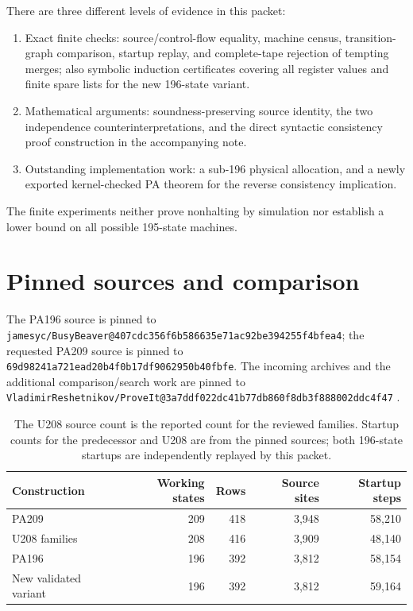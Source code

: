 \documentclass[11pt,letterpaper]{article}
\newcommand{\file}[1]{\texttt{\nolinkurl{#1}}}
\begin{document}
There are three different levels of evidence in this packet:
\begin{enumerate}
\item Exact finite checks: source/control-flow equality, machine census,
transition-graph comparison, startup replay, and complete-tape rejection
of tempting merges; also symbolic induction certificates covering all
register values and finite spare lists for the new 196-state variant.
\item Mathematical arguments: soundness-preserving source identity,
the two independence counterinterpretations, and the direct syntactic
consistency proof construction in the accompanying note.
\item Outstanding implementation work: a sub-196 physical allocation,
and a newly exported
kernel-checked PA theorem for the reverse consistency implication.
\end{enumerate}
The finite experiments neither prove nonhalting by simulation nor establish
a lower bound on all possible 195-state machines.

\section{Pinned sources and comparison}

The PA196 source is pinned to
\file{jamesyc/BusyBeaver@407cdc356f6b586635e71ac92be394255f4bfea4};
the requested PA209 source is pinned to
\file{69d98241a721ead20b4f0b17df9062950b40fbfe}.
The incoming archives and the additional comparison/search work are pinned
to \file{VladimirReshetnikov/ProveIt@3a7ddf022dc41b77db860f8db3f888002ddc4f47}
\cite{pa196,pa209,incoming,comparison}.

\begin{table}[ht]
\centering
\begin{tabular}{@{}lrrrr@{}}
\toprule
Construction & Working states & Rows & Source sites & Startup steps\\
\midrule
PA209 &209&418&3,948&58,210\\
U208 families &208&416&3,909&48,140\\
PA196 &196&392&3,812&58,154\\
New validated variant &196&392&3,812&59,164\\
\bottomrule
\end{tabular}
\caption{The U208 source count is the reported count for the reviewed
families. Startup counts for the predecessor and U208 are from the pinned
sources; both 196-state startups are independently replayed by this packet.}
\end{table}
\end{document}
